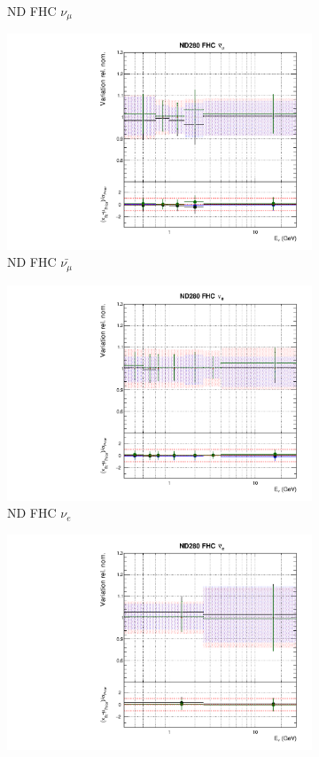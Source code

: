 \begin{figure}
\begin{subfigure}{0.45\textwidth}
  \caption{ND FHC $\nu_{\mu}$}
\end{subfigure}
\begin{subfigure}{0.45\textwidth}
  \centering
  \includegraphics[width=0.75\linewidth]{figs/hptpcfitsflux_1}
  \caption{ND FHC $\bar{\nu_{\mu}}$}
\end{subfigure}
\begin{subfigure}{0.45\textwidth}
  \centering
  \includegraphics[width=0.75\linewidth]{figs/hptpcfitsflux_2}
  \caption{ND FHC $\nu_e$}
\end{subfigure}
\begin{subfigure}{0.45\textwidth}
  \centering
  \includegraphics[width=0.75\linewidth]{figs/hptpcfitsflux_3}

\end{subfigure}
\end{figure}
